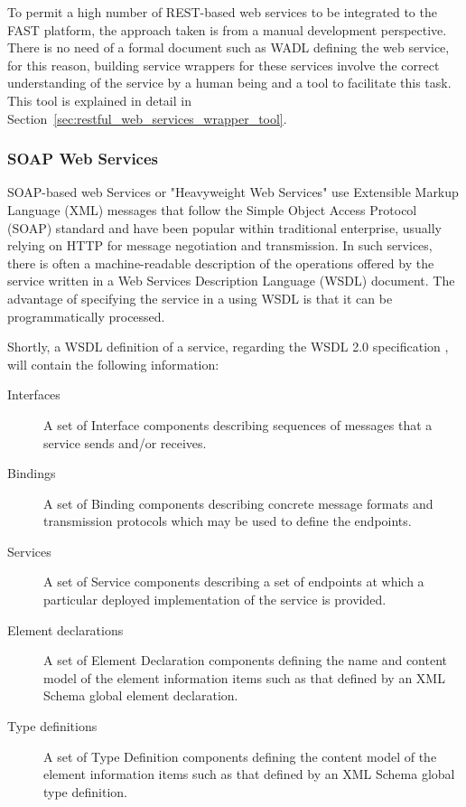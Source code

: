 \documentclass{fast_latex}
\begin{document}
To permit a high number of REST-based web services to be integrated to the FAST platform, the approach taken is from a manual development perspective. There is no need of a formal document such as WADL defining the web service, for this reason, building service wrappers for these services involve the correct understanding of the service by a human being and a tool to facilitate this task. This tool is explained in detail in Section~\ref{sec:restful_web_services_wrapper_tool}.


\subsubsection{SOAP Web Services} %
\label{ssub:soap_web_services}

SOAP-based web Services or "Heavyweight Web Services" use Extensible Markup Language (XML) \cite{XML1.1} messages that follow the Simple Object Access Protocol (SOAP) standard \cite{SOAP1.2} and have been popular within traditional enterprise, usually relying on HTTP for message negotiation and transmission. In such services, there is often a machine-readable description of the operations offered by the service written in a Web Services Description Language (WSDL) document. The advantage of specifying the service in a using WSDL is that it can be programmatically processed. 

Shortly, a WSDL definition of a service, regarding the WSDL 2.0 specification \cite{WSDL2.0}, will contain the following information:
\begin{description}
	\item[Interfaces] A set of Interface components describing sequences of messages that a service sends and/or receives.
	\item[Bindings] A set of Binding components describing concrete message formats and transmission protocols which may be used to define the endpoints.
	\item[Services] A set of Service components describing a set of endpoints at which a particular deployed implementation of the service is provided.
	\item[Element declarations] A set of Element Declaration components defining the name and content model of the element information items such as that defined by an XML Schema global element declaration.
	\item[Type definitions] A set of Type Definition components defining the content model of the element information items such as that defined by an XML Schema global type definition.
\end{description}
\end{document}
